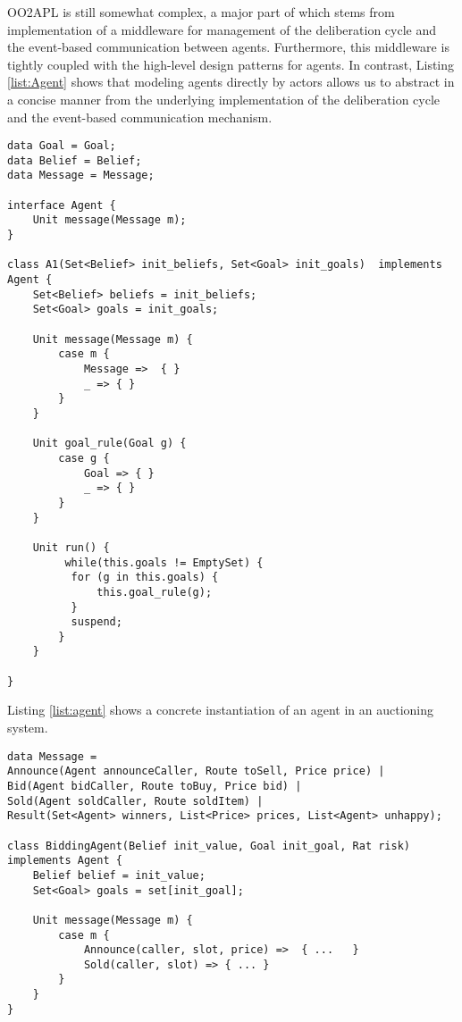 OO2APL is still somewhat complex, a major part of which stems from  implementation of a middleware for management of the deliberation cycle and the event-based communication between agents. 
Furthermore, this middleware is tightly coupled with the high-level design patterns for agents.
In contrast,  Listing \ref{list:Agent} shows that modeling agents directly by actors  allows us to abstract in a concise manner from the underlying implementation of the deliberation cycle  and the event-based communication mechanism.



\begin{lstlisting}[caption= Generic Agent Model, label=list:Agent]
data Goal = Goal;
data Belief = Belief;
data Message = Message;

interface Agent {
	Unit message(Message m);
}

class A1(Set<Belief> init_beliefs, Set<Goal> init_goals)  implements Agent {
	Set<Belief> beliefs = init_beliefs;
	Set<Goal> goals = init_goals;
	
	Unit message(Message m) {
		case m { 
			Message =>  { }
			_ => { }
		}
	}
	
	Unit goal_rule(Goal g) {
		case g {
			Goal => { }
			_ => { }
		}
	}
	
	Unit run() {
		 while(this.goals != EmptySet) {
		  for (g in this.goals) {
		      this.goal_rule(g);
		  }
		  suspend;
		}
	}

}

\end{lstlisting}



Listing \ref{list:agent} shows a concrete instantiation of an agent  in an auctioning system.

\begin{lstlisting}[caption= Agent Model, label=list:agent]
data Message = 
Announce(Agent announceCaller, Route toSell, Price price) | 
Bid(Agent bidCaller, Route toBuy, Price bid) |
Sold(Agent soldCaller, Route soldItem) |
Result(Set<Agent> winners, List<Price> prices, List<Agent> unhappy);

class BiddingAgent(Belief init_value, Goal init_goal, Rat risk) implements Agent {
	Belief belief = init_value;
	Set<Goal> goals = set[init_goal];
	
	Unit message(Message m) {
		case m {
			Announce(caller, slot, price) =>  { ...   } 
		    Sold(caller, slot) => { ... }
		}
	}
}
\end{lstlisting}


